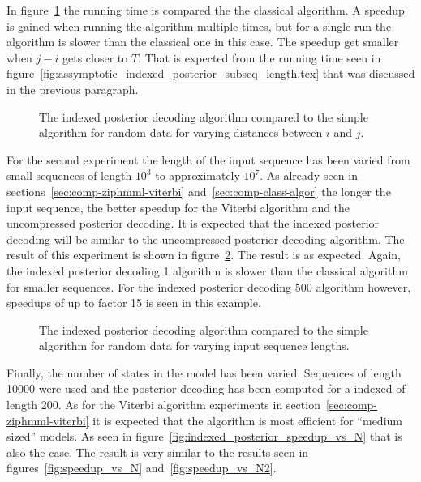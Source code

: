 In figure~\ref{fig:indexed_posterior_speedup_vs_subseq} the running time is
compared the the classical algorithm. A speedup is gained when running the
algorithm multiple times, but for a single run the algorithm is slower than the
classical one in this case. The speedup get smaller when $j - i$ gets closer to
$T$. That is expected from the running time seen in
figure~\ref{fig:assymptotic_indexed_posterior_subseq_length.tex} that was
discussed in the previous paragraph.

\begin{figure}
  \centering
  
  \caption{The indexed posterior decoding algorithm compared to the simple
    algorithm for random data for varying distances between $i$ and $j$.}
  \label{fig:indexed_posterior_speedup_vs_subseq}
\end{figure}

For the second experiment the length of the input sequence has been varied from
small sequences of length $10^3$ to approximately $10^7$. As already seen in
sections~\ref{sec:comp-ziphmml-viterbi} and~\ref{sec:comp-class-algor} the
longer the input sequence, the better speedup for the Viterbi algorithm and the
uncompressed posterior decoding. It is expected that the indexed posterior
decoding will be similar to the uncompressed posterior decoding algorithm. The
result of this experiment is shown in
figure~\ref{fig:indexed_posterior_speedup_vs_T}. The result is as
expected. Again, the indexed posterior decoding 1 algorithm is slower than
the classical algorithm for smaller sequences. For the indexed posterior
decoding 500 algorithm however, speedups of up to factor 15 is seen in this
example.

\begin{figure}
  \centering
  
  \caption{The indexed posterior decoding algorithm compared to the simple
    algorithm for random data for varying input sequence lengths.}
  \label{fig:indexed_posterior_speedup_vs_T}
\end{figure}

Finally, the number of states in the model has been varied. Sequences of length
10000 were used and the posterior decoding has been computed for a indexed of
length 200. As for the Viterbi algorithm experiments in
section~\ref{sec:comp-ziphmml-viterbi} it is expected that the algorithm is
most efficient for ``medium sized'' models. As seen in
figure~\ref{fig:indexed_posterior_speedup_vs_N} that is also the case. The
result is very similar to the results seen in figures~\ref{fig:speedup_vs_N}
and~\ref{fig:speedup_vs_N2}.

